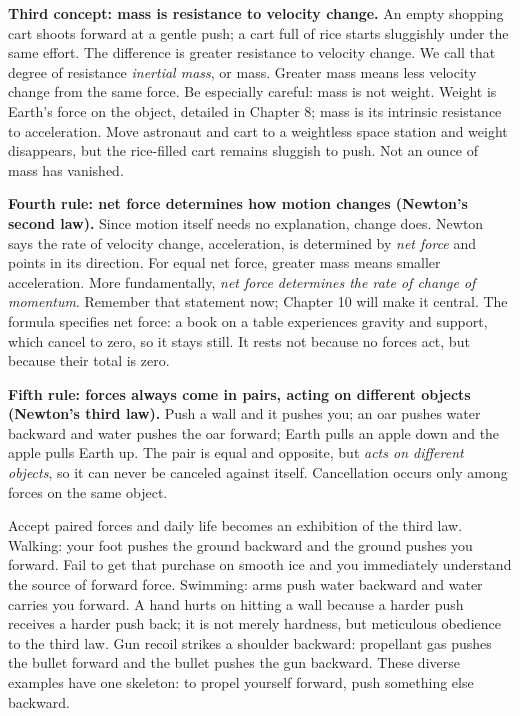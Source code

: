 \begin{mainline}
\textbf{Third concept: mass is resistance to velocity change.} An empty shopping cart shoots forward at a gentle push; a cart full of rice starts sluggishly under the same effort. The difference is greater resistance to velocity change. We call that degree of resistance \emph{inertial mass}, or mass. Greater mass means less velocity change from the same force. Be especially careful: mass is not weight. Weight is Earth's force on the object, detailed in Chapter 8; mass is its intrinsic resistance to acceleration. Move astronaut and cart to a weightless space station and weight disappears, but the rice-filled cart remains sluggish to push. Not an ounce of mass has vanished.

\textbf{Fourth rule: net force determines how motion changes (Newton's second law).} Since motion itself needs no explanation, change does. Newton says the rate of velocity change, acceleration, is determined by \emph{net force} and points in its direction. For equal net force, greater mass means smaller acceleration. More fundamentally, \emph{net force determines the rate of change of momentum}. Remember that statement now; Chapter 10 will make it central. The formula specifies net force: a book on a table experiences gravity and support, which cancel to zero, so it stays still. It rests not because no forces act, but because their total is zero.

\textbf{Fifth rule: forces always come in pairs, acting on different objects (Newton's third law).} Push a wall and it pushes you; an oar pushes water backward and water pushes the oar forward; Earth pulls an apple down and the apple pulls Earth up. The pair is equal and opposite, but \emph{acts on different objects}, so it can never be canceled against itself. Cancellation occurs only among forces on the same object.

Accept paired forces and daily life becomes an exhibition of the third law. Walking: your foot pushes the ground backward and the ground pushes you forward. Fail to get that purchase on smooth ice and you immediately understand the source of forward force. Swimming: arms push water backward and water carries you forward. A hand hurts on hitting a wall because a harder push receives a harder push back; it is not merely hardness, but meticulous obedience to the third law. Gun recoil strikes a shoulder backward: propellant gas pushes the bullet forward and the bullet pushes the gun backward. These diverse examples have one skeleton: to propel yourself forward, push something else backward.
\end{mainline}

